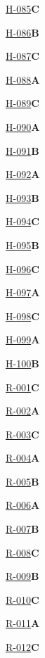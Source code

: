 \noindent\hyperref[q:H-085]{H-085}\hfill\textbf{C}\par
\noindent\hyperref[q:H-086]{H-086}\hfill\textbf{B}\par
\noindent\hyperref[q:H-087]{H-087}\hfill\textbf{C}\par
\noindent\hyperref[q:H-088]{H-088}\hfill\textbf{A}\par
\noindent\hyperref[q:H-089]{H-089}\hfill\textbf{C}\par
\noindent\hyperref[q:H-090]{H-090}\hfill\textbf{A}\par
\noindent\hyperref[q:H-091]{H-091}\hfill\textbf{B}\par
\noindent\hyperref[q:H-092]{H-092}\hfill\textbf{A}\par
\noindent\hyperref[q:H-093]{H-093}\hfill\textbf{B}\par
\noindent\hyperref[q:H-094]{H-094}\hfill\textbf{C}\par
\noindent\hyperref[q:H-095]{H-095}\hfill\textbf{B}\par
\noindent\hyperref[q:H-096]{H-096}\hfill\textbf{C}\par
\noindent\hyperref[q:H-097]{H-097}\hfill\textbf{A}\par
\noindent\hyperref[q:H-098]{H-098}\hfill\textbf{C}\par
\noindent\hyperref[q:H-099]{H-099}\hfill\textbf{A}\par
\noindent\hyperref[q:H-100]{H-100}\hfill\textbf{B}\par
\noindent\hyperref[q:R-001]{R-001}\hfill\textbf{C}\par
\noindent\hyperref[q:R-002]{R-002}\hfill\textbf{A}\par
\noindent\hyperref[q:R-003]{R-003}\hfill\textbf{C}\par
\noindent\hyperref[q:R-004]{R-004}\hfill\textbf{A}\par
\noindent\hyperref[q:R-005]{R-005}\hfill\textbf{B}\par
\noindent\hyperref[q:R-006]{R-006}\hfill\textbf{A}\par
\noindent\hyperref[q:R-007]{R-007}\hfill\textbf{B}\par
\noindent\hyperref[q:R-008]{R-008}\hfill\textbf{C}\par
\noindent\hyperref[q:R-009]{R-009}\hfill\textbf{B}\par
\noindent\hyperref[q:R-010]{R-010}\hfill\textbf{C}\par
\noindent\hyperref[q:R-011]{R-011}\hfill\textbf{A}\par
\noindent\hyperref[q:R-012]{R-012}\hfill\textbf{C}\par
